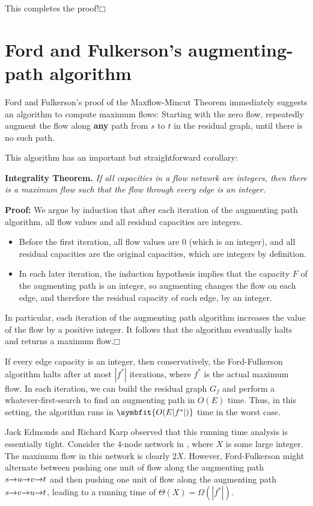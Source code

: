 This completes the proof!\hfill$\mdlgwhtsquare$

\section{Ford and Fulkerson’s augmenting-path algorithm}
\label{sec:10.4}

Ford and Fulkerson’s proof of the Maxflow-Mincut Theorem immediately suggests an algorithm to compute maximum flows: Starting with the zero flow, repeatedly augment the flow along \textbf{any} path from $s$ to $t$ in the residual graph, until there is no such path.

This algorithm has an important but straightforward corollary:

\noindent\textbf{Integrality Theorem.} \textsl{If all capacities in a flow network are integers, then there is a maximum flow such that the flow through every edge is an integer.}

\noindent\textbf{Proof:} We argue by induction that after each iteration of the augmenting path algorithm, all flow values and all residual capacities are integers.
\begin{itemize}
\item Before the first iteration, all flow values are $0$ (which is an integer), and all residual capacities are the original capacities, which are integers by definition.
\item In each later iteration, the induction hypothesis implies that the capacity $F$ of the augmenting path is an integer, so augmenting changes the flow on each edge, and therefore the residual capacity of each edge, by an integer.
\end{itemize}
\noindent In particular, each iteration of the augmenting path algorithm increases the value of the flow by a positive integer.
It follows that the algorithm eventually halts and returns a maximum flow.\hfill$\mdlgwhtsquare$

If every edge capacity is an integer, then conservatively, the Ford-Fulkerson algorithm halts after at most $|f^*|$ iterations, where $f^*$ is the actual maximum flow.
In each iteration, we can build the residual graph $G_f$ and perform a whatever-first-search to find an augmenting path in $O(E)$ time.
Thus, in this setting, the algorithm runs in $\symbfit{O(E|f^*|)}$ time in the worst case.

Jack Edmonds and Richard Karp observed that this running time analysis is essentially tight.
Consider the 4-node network in , where $X$ is some large integer.
The maximum flow in this network is clearly $2X$.
However, Ford-Fulkerson might alternate between pushing one unit of flow along the augmenting path $s\mathord{\rightarrow}u\mathord{\rightarrow}v\mathord{\rightarrow}t$ and then pushing one unit of flow along the augmenting path $s\mathord{\rightarrow}v\mathord{\rightarrow}u\mathord{\rightarrow}t$, leading to a running time of $\Theta(X) = \Omega(|f^*|)$.

